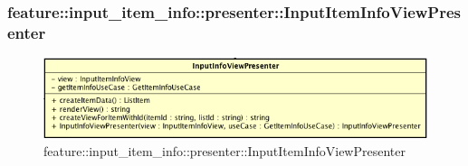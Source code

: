 \subsubsection{feature::input\_item\_info::presenter::InputItemInfoViewPresenter}

\label{feature::input_item_info::presenter::InputItemInfoViewPresenter}
\begin{figure}[ht]
	\centering
	\includegraphics[scale=0.5]{Sezioni/SottosezioniST/img/app/InputInfoViewPresenter.png}
	\caption{feature::input\_item\_info::presenter::InputItemInfoViewPresenter}
\end{figure}


